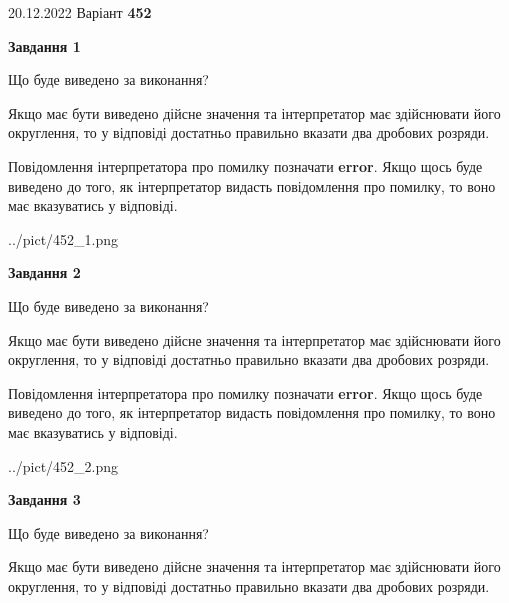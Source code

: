 \documentclass[12pt, ukrainian]{article}
\begin{document}
{20.12.2022 Варіант \No \textbf { 452 }\par}
{
\begin {Large}

{\begin {center}\textbf{Завдання 1}\end {center}}\par
Що буде виведено за виконання? \par

Якщо має бути виведено дійсне значення та інтерпретатор має здійснювати його округлення, 
то у відповіді достатньо правильно вказати два дробових розряди.

Повідомлення інтерпретатора про помилку позначати \textbf{error}.
Якщо щось буде виведено до того, як інтерпретатор видасть повідомлення про помилку, 
то воно має вказуватись у відповіді. \par

\begin{center}
	{../pict/452_1.png}
\end{center}
\newpage

{\begin {center}\textbf{Завдання 2}\end {center}}\par
Що буде виведено за виконання? \par

Якщо має бути виведено дійсне значення та інтерпретатор має здійснювати його округлення, 
то у відповіді достатньо правильно вказати два дробових розряди.

Повідомлення інтерпретатора про помилку позначати \textbf{error}.
Якщо щось буде виведено до того, як інтерпретатор видасть повідомлення про помилку, 
то воно має вказуватись у відповіді. \par

\begin{center}
	{../pict/452_2.png}
\end{center}
\newpage

{\begin {center}\textbf{Завдання 3}\end {center}}\par
Що буде виведено за виконання? \par

Якщо має бути виведено дійсне значення та інтерпретатор має здійснювати його округлення, 
то у відповіді достатньо правильно вказати два дробових розряди.


\end{Large}}
\end{document}

